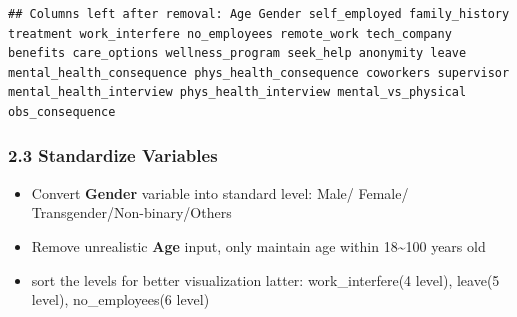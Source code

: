 \documentclass[
]{article}
\begin{document}
\begin{verbatim}
## Columns left after removal: Age Gender self_employed family_history treatment work_interfere no_employees remote_work tech_company benefits care_options wellness_program seek_help anonymity leave mental_health_consequence phys_health_consequence coworkers supervisor mental_health_interview phys_health_interview mental_vs_physical obs_consequence
\end{verbatim}

\subsubsection{2.3 Standardize Variables}\label{standardize-variables}

\begin{itemize}
\item
  Convert \textbf{Gender} variable into standard level: Male/ Female/
  Transgender/Non-binary/Others
\item
  Remove unrealistic \textbf{Age} input, only maintain age within
  18\textasciitilde100 years old
\item
  sort the levels for better visualization latter: work\_interfere(4
  level), leave(5 level), no\_employees(6 level)
\end{itemize}
\end{document}
